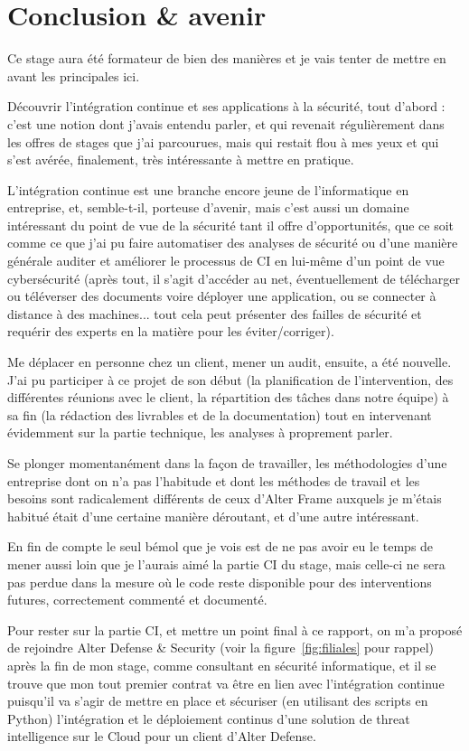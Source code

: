 \section{Conclusion \& avenir}
\label{sec:ccl}
Ce stage aura été formateur de bien des manières et je vais tenter de mettre en avant les principales ici. 

Découvrir l'intégration continue et ses applications à la sécurité, tout d'abord : c'est une notion dont j'avais entendu parler, et qui revenait régulièrement dans les offres de stages que j'ai parcourues, mais qui restait flou à mes yeux et qui s'est avérée, finalement, très intéressante à mettre en pratique. 

L'intégration continue est une branche encore jeune de l'informatique en entreprise, et, semble-t-il, porteuse d'avenir, mais c'est aussi un domaine intéressant du point de vue de la sécurité tant il offre d'opportunités, que ce soit comme ce que j'ai pu faire automatiser des analyses de sécurité ou d'une manière générale auditer et améliorer le processus de CI en lui-même d'un point de vue cybersécurité (après tout, il s'agit d'accéder au net, éventuellement de télécharger ou téléverser des documents voire déployer une application, ou se connecter à distance à des machines... tout cela peut présenter des failles de sécurité et requérir des experts en la matière pour les éviter/corriger). 

Me déplacer en personne chez un client, mener un audit, ensuite, a été nouvelle. J'ai pu participer à ce projet de son début (la planification de l'intervention, des différentes réunions avec le client, la répartition des tâches dans notre équipe) à sa fin (la rédaction des livrables et de la documentation) tout en intervenant évidemment sur la partie technique, les analyses à proprement parler. 

Se plonger momentanément dans la façon de travailler, les méthodologies d'une entreprise dont on n'a pas l'habitude et dont les méthodes de travail et les besoins sont radicalement différents de ceux d'Alter Frame auxquels je m'étais habitué était d'une certaine manière déroutant, et d'une autre intéressant. 

En fin de compte le seul bémol que je vois est de ne pas avoir eu le temps de mener aussi loin que je l'aurais aimé la partie CI du stage, mais celle-ci ne sera pas perdue dans la mesure où le code reste disponible pour des interventions futures, correctement commenté et documenté. 

Pour rester sur la partie CI, et mettre un point final à ce rapport, on m'a proposé de rejoindre Alter Defense \& Security (voir la figure~\ref{fig:filiales} pour rappel) après la fin de mon stage, comme consultant en sécurité informatique, et il se trouve que mon tout premier contrat va être en lien avec l'intégration continue puisqu'il va s'agir de mettre en place et sécuriser (en utilisant des scripts en Python) l'intégration et le déploiement continus d'une solution de threat intelligence\cite{threat_intell_wiki} sur le Cloud pour un client d'Alter Defense.

